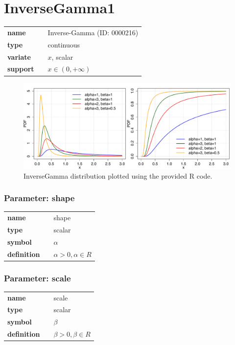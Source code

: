 \section*{InverseGamma1} 

  \bigskip 

\begin{tabular}{p{2cm}cl}
\textbf{name} & & Inverse-Gamma (ID: 0000216)\\ 
 
\textbf{type} & & continuous \\ 

\textbf{variate} & & $x$, scalar \\ 

\textbf{support} & & $x \in (0,+\infty)$
\end{tabular}

\begin{figure}[ht!]
\centering
  \includegraphics[width=140mm]{pics/InverseGamma.pdf}
 \caption{InverseGamma distribution plotted using the provided R code.}
 \label{fig:InverseGamma}
\end{figure}

\subsubsection*{Parameter: shape}

\noindent\begin{tabular}{p{2cm}cl}
\textbf{name} & & shape \\
\textbf{type} & & scalar \\
\textbf{symbol} & & $\alpha$  \\
\textbf{definition} & & $\alpha>0, \alpha \in  R$
\end{tabular}
\subsubsection*{Parameter: scale}

\noindent\begin{tabular}{p{2cm}cl}
\textbf{name} & & scale \\
\textbf{type} & & scalar \\
\textbf{symbol} & & $\beta$  \\
\textbf{definition} & & $\beta>0, \beta \in  R$
\end{tabular}
